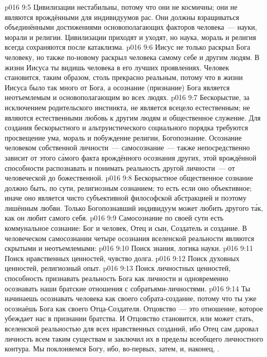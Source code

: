 \vs p016 9:5 Цивилизации нестабильны, потому что они не космичны; они не являются врождёнными для индивидуумов рас. Они должны взращиваться объединёнными достижениями основополагающих факторов человека~--- науки, морали и религии. Цивилизации приходят и уходят, но наука, мораль и религия всегда сохраняются после катаклизма.
\vs p016 9:6 Иисус не только раскрыл Бога человеку, но также по\hyp{}новому раскрыл человека самому себе и другим людям. В жизни Иисуса ты видишь человека в его лучших проявлениях. Человек становится, таким образом, столь прекрасно реальным, потому что в жизни Иисуса было так много от Бога, а осознание (признание) Бога является неотъемлемым и основополагающим во всех людях.
\vs p016 9:7 \pc Бескорыстие, за исключением родительского инстинкта, не является всецело естественным; не являются естественными любовь к другим людям и общественное служение. Для создания бескорыстного и альтруистического социального порядка требуются просвещение ума, мораль и побуждение религии, Богопознание. Осознание человеком собственной личности~--- самосознание~--- также непосредственно зависит от этого с\'амого факта врождённого осознания других, этой врождённой способности распознавать и понимать реальность другой личности~--- от человеческой до божественной.
\vs p016 9:8 Бескорыстное общественное сознание должно быть, по сути, религиозным сознанием; то есть если оно объективное; иначе оно является чисто субъективной философской абстракцией и поэтому лишённым любви. Только Богопознавший индивидуум может любить другого т\'ак, как он любит самого себя.
\vs p016 9:9 Самосознание по своей сути есть коммунальное сознание: Бог и человек, Отец и сын, Создатель и создание. В человеческом самосознании четыре осознания вселенской реальности являются скрытыми и неотъемлемыми:
\vs p016 9:10 Поиск знания, логика науки.
\vs p016 9:11 Поиск нравственных ценностей, чувство долга.
\vs p016 9:12 Поиск духовных ценностей, религиозный опыт.
\vs p016 9:13 Поиск личностных ценностей, способность признавать реальность Бога как личности и одновременно осознавать наши братские отношения с собратьями\hyp{}личностями.
\vs p016 9:14 \pc Ты начинаешь осознавать человека как своего собрата\hyp{}создание, потому что ты уже осознаёшь Бога как своего Отца\hyp{}Создателя. Отцовство~--- это отношение, которое убеждает нас в признании братства. И Отцовство становится, или может стать, вселенской реальностью для всех нравственных созданий, ибо Отец сам даровал личность всем таким существам и заключил их в пределы всеобщего личностного контура. Мы поклоняемся Богу, ибо, во\hyp{}первых,  затем,  и, наконец, .
